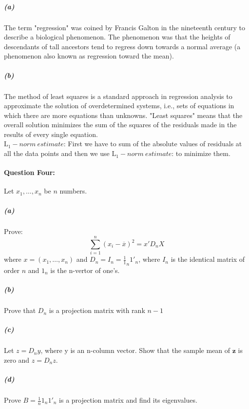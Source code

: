 \documentclass[UTF8]{article}
\begin{document}
\paragraph{\color{red}{Answer:}}
  \subparagraph{(a)}
    The term "regression" was coined by Francis Galton in the nineteenth century
    to describe a biological phenomenon. The phenomenon was that the heights of
    descendants of tall ancestors tend to regress down towards a normal average
    (a phenomenon also known as regression toward the mean).
  \subparagraph{(b)}
    The method of least squares is a standard approach in regression analysis to
    approximate the solution of overdetermined systems, i.e., sets of equations in
    which there are more equations than unknowns. "Least squares" means that the
    overall solution minimizes the sum of the squares of the residuals made in the
    results of every single equation.
    \\
    $\mathrm{L}_1 - norm \ estimate$: First we have to sum of the absolute
    values of residuals at all the data points and then we use $\mathrm{L}_1 - norm \ estimate$:
     to minimize them.

\paragraph{Question Four:}
  Let $x_1, \dots, x_n$ be $n$ numbers.

  \subparagraph{(a)}
    Prove:
    \boldmath
    $$
      \sum^n_{i=1}(x_i - \overline{x})^2 ={x'D_nX}
    $$
    where ${x} = (x_1,\dots,x_n)$ and ${D_n = I_n} = \frac{1} 1_n {1'}_n$,
    where $I_n$ is the identical matrix of order $n$ and ${1_n}$ is the n-vertor
    of one's.

  \subparagraph{(b)}
    Prove that ${D_n}$ is a projection matrix with rank $n - 1$
  \subparagraph{(c)}

    Let ${z = D_ny}$, where y is an n-column vector. Show that the sample mean of $\textbf{z}$
    is zero and $z = D_nz$.
  \subparagraph{(d)}

    Prove ${B = \frac{1}{n}1_n{1'}_n}$ is a projection matrix and find its eigenvalues.
\end{document}

